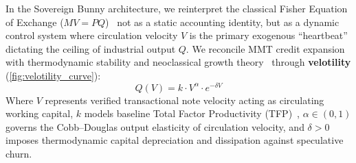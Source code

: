 \documentclass[a4paper,11pt,twoside,parskip=half-,headings=small]{scrartcl}
\begin{document}
In the Sovereign Bunny architecture, we reinterpret the classical Fisher Equation of Exchange ($MV = PQ$)~\cite{fisher1911} not as a static accounting identity, but as a dynamic control system where circulation velocity $V$ is the primary exogenous ``heartbeat'' dictating the ceiling of industrial output $Q$.
We reconcile MMT credit expansion with thermodynamic stability and neoclassical growth theory~\cite{solow1956,cobbdouglas1928} through \textbf{velotility} (\cref{fig:velotility_curve}):
\begin{equation}
Q(V) = k \cdot V^\alpha \cdot e^{-\delta V}
  \label{eq:velotility}
\end{equation}
Where $V$ represents verified transactional note velocity acting as circulating working capital, $k$ models baseline Total Factor Productivity (TFP)~\cite{solow1956}, $\alpha \in (0, 1)$ governs the Cobb--Douglas output elasticity of circulation velocity, and $\delta > 0$ imposes thermodynamic capital depreciation and dissipation against speculative churn. 
\end{document}
